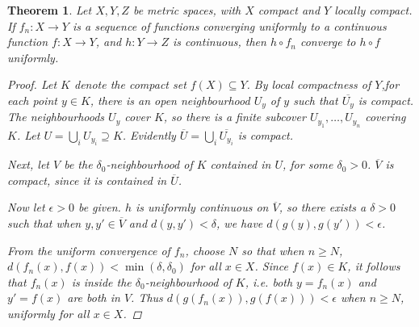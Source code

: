 \documentclass[12pt]{article}
\providecommand{\clos}[1]{\overline{#1}}
\newtheorem{thm}{Theorem}
\begin{document}
\begin{thm}
Let $X, Y, Z$ be metric spaces, with $X$ compact and $Y$ locally compact.
If $f_n\colon X \to Y$ is a sequence of functions converging uniformly
to a continuous function $f\colon X \to Y$, and $h\colon Y \to Z$
is continuous, then $h\circ f_n$ converge to $h \circ f$ uniformly.

\begin{proof}
Let $K$ denote the compact set $f(X) \subseteq Y$.  By local compactness of $Y$,for each point $y \in K$, there is an open neighbourhood $U_y$ of $y$ such that
$\clos{U_y}$ is compact.  The neighbourhoods $U_y$ cover $K$, so there is a finite
subcover $U_{y_1}, \dotsc, U_{y_n}$ covering $K$.  Let
$U = \bigcup_i U_{y_i} \supseteq K$.  Evidently
$\clos{U} = \bigcup_i \clos{U_{y_i}}$ is compact.

Next, let $V$ be the $\delta_0$-neighbourhood  of $K$
contained in $U$, for some $\delta_0 > 0$.
$\clos{V}$ is compact, since it is contained in $\clos{U}$.

Now let $\epsilon > 0$ be given.
$h$ is uniformly continuous on $\clos{V}$, so
there exists a $\delta > 0$ such that
when $y, y' \in \clos{V}$ and $d(y, y') < \delta$,
we have $d(g(y), g(y')) < \epsilon$.

From the uniform convergence of $f_n$, choose $N$ so that
when $n \geq N$, $d(f_n(x), f(x)) < \min(\delta, \delta_0)$
for all $x \in X$.
Since $f(x) \in K$, it follows that $f_n(x)$ is inside the
$\delta_0$-neighbourhood of $K$, i.e. both $y = f_n(x)$ and $y' = f(x)$
are both in $V$.  Thus $d(g(f_n(x)), g(f(x))) < \epsilon$ when $n \geq N$,
uniformly for all $x \in X$.
\end{proof}
\end{thm}
\end{document}

